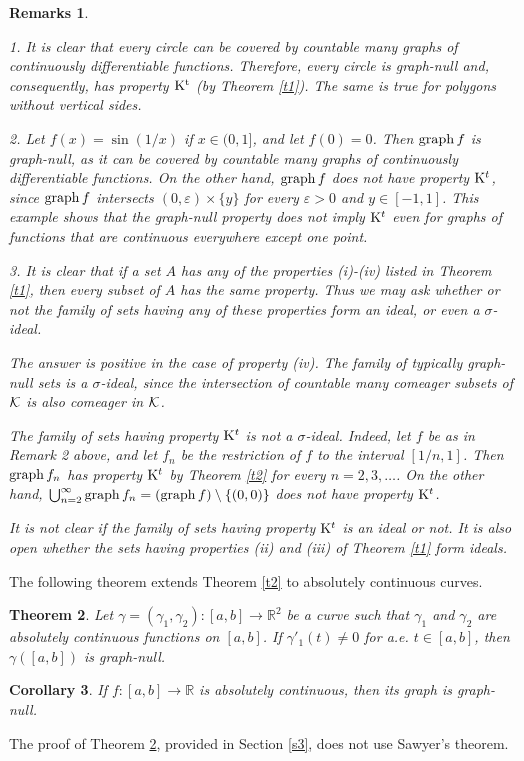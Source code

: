 \documentclass[12pt]{article}
\newtheorem{theorem}{Theorem}[section]
\newtheorem{remarks}[theorem]{Remarks}
\newtheorem{cor}[theorem]{Corollary}
\def\rr{{\mathbb R}}
\def\kk{{\cal K}}
\def\sik{{\rr}^2}
\def\se{\setminus}
\def\ga{\gamma}
\def\ep{\varepsilon}
\def\si{\sigma}
\def\graph{{\rm graph}\, }
\begin{document}
\begin{remarks}\label{r1}
{\rm 1.
It is clear that every circle can be covered by countable many graphs of 
continuously differentiable functions. Therefore, {\it every circle is
graph-null and, consequently, has property ${\rm K^t}$} (by Theorem \ref{t1}).
The same is true for polygons without vertical sides.

2. Let $f(x)=\sin (1/x)$ if $x\in (0,1]$, and let $f(0)=0$. Then $\graph f$
is graph-null, as it can be covered by countable many graphs of continuously
differentiable functions. On the other hand, $\graph f$ does not have
property ${\rm K}^t$, since $\graph f$ intersects $(0,\ep )\times \{ y\}$
for every $\ep >0$ and $y\in [-1,1]$. This example shows that the graph-null
property does not imply ${\rm K}^t$ even for graphs of functions that are
continuous everywhere except one point.

3. It is clear that if a set $A$ has any of the properties (i)-(iv) listed
in Theorem \ref{t1}, then every subset of $A$ has the same property. Thus we
may ask whether or not the family of sets having any of these properties form
an ideal, or even a $\si$-ideal.

The answer is positive in the case of property (iv). The family of
typically graph-null sets is a $\si$-ideal, since the intersection of countable
many comeager subsets of $\kk$ is also comeager in $\kk$.

The family of sets having property ${\rm K}^t$ is not a $\si$-ideal. Indeed,
let $f$ be as in Remark 2 above, and let $f_n$ be the restriction of $f$
to the interval $[1/n,1]$. Then $\graph f_n$ has property ${\rm K}^t$ by
Theorem \ref{t2} for every $n=2,3,\ldots$. On the other hand,
$\bigcup_{n=2}^\infty \graph f_n =(\graph f) \se \{ (0,0)\}$ does not have
property ${\rm K}^t$.

It is not clear if the family of sets having property ${\rm K}^t$ is an ideal
or not. It is also open whether the sets having properties (ii) and (iii) of
Theorem \ref{t1} form ideals. 
}
\end{remarks}  
    
The following theorem extends Theorem \ref{t2} to absolutely continuous curves.
\begin{theorem}\label{t3}
Let $\ga =(\ga _1 ,\ga _2 )\colon [a,b] \to \sik$ be a curve such that
$\ga _1$ and $\ga _2$ are absolutely continuous functions on $[a,b]$. If 
$\ga '_1 (t)\ne 0$ for a.e. $t\in [a,b]$, then  $\ga ([a,b])$ is graph-null.
\end{theorem}
\begin{cor}\label{c2}
If $f\colon [a,b]\to \rr$ is absolutely continuous, then its graph is
graph-null. 
\end{cor}
The proof of Theorem \ref{t3}, provided in Section \ref{s3}, does not use
Sawyer's theorem.
\end{document}
